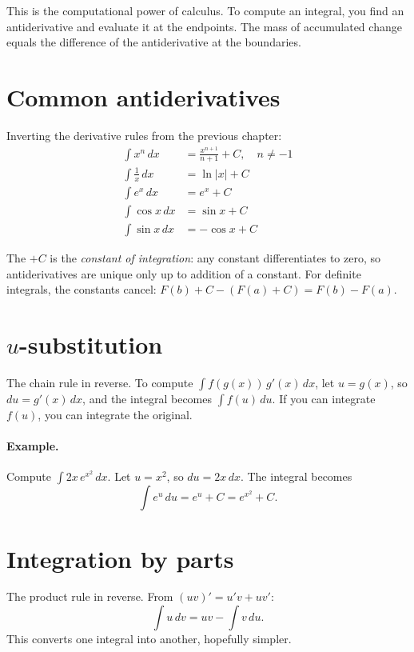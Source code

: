 This is the computational power of calculus. To compute an integral, you find an antiderivative and evaluate it at the endpoints. The mass of accumulated change equals the difference of the antiderivative at the boundaries.

\section{Common antiderivatives}

Inverting the derivative rules from the previous chapter:
\begin{align}
  \int x^n \, dx &= \frac{x^{n+1}}{n+1} + C, \quad n \neq -1 \\[4pt]
  \int \frac{1}{x}\, dx &= \ln|x| + C \\[4pt]
  \int e^x \, dx &= e^x + C \\[4pt]
  \int \cos x \, dx &= \sin x + C \\[4pt]
  \int \sin x \, dx &= -\cos x + C
\end{align}

The $+C$ is the \emph{constant of integration}: any constant differentiates to zero, so antiderivatives are unique only up to addition of a constant. For definite integrals, the constants cancel: $F(b) + C - (F(a) + C) = F(b) - F(a)$.

\section{$u$-substitution}

The chain rule in reverse. To compute $\int f(g(x))\,g'(x)\,dx$, let $u = g(x)$, so $du = g'(x)\,dx$, and the integral becomes $\int f(u)\,du$. If you can integrate $f(u)$, you can integrate the original.

\paragraph{Example.} Compute $\int 2x\, e^{x^2}\,dx$. Let $u = x^2$, so $du = 2x\,dx$. The integral becomes
\[
  \int e^u \, du = e^u + C = e^{x^2} + C.
\]

\section{Integration by parts}

The product rule in reverse. From $(uv)' = u'v + uv'$:
\[
  \int u\,dv = uv - \int v\,du.
\]
This converts one integral into another, hopefully simpler.

